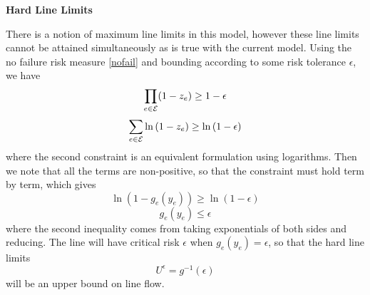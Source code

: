 \textbf{Hard Line Limits}

There is a notion of maximum line limits in this model, however these line limits cannot be attained simultaneously as is true with the current model.  Using the no failure risk measure \ref{nofail} and bounding according to some risk tolerance $\epsilon$, we have
\[ \prod_{e \in \mathcal{E}} (1-z_e) \geq 1 - \epsilon \]
\[ \sum_{e \in \mathcal{E}} \ln \left( 1-z_e \right) \geq \ln \left(1-\epsilon \right) \]
where the second constraint is an equivalent formulation using logarithms.
Then we note that all the terms are non-positive, so that the constraint must hold term by term, which gives
\[ \ln \left( 1 - g_e(y_e)  \right) \geq \ln \left( 1- \epsilon \right) \]
\begin{equation*}
g_e(y_e) \leq \epsilon
\end{equation*}
where the second inequality comes from taking exponentials of both sides and reducing. The line will have critical risk $\epsilon$ when $g_e(y_e) = \epsilon$, so that the hard line limits
\begin{equation} \label{hardline}
U^{\epsilon} = g^{-1}\left(\epsilon\right)
\end{equation}
will be an upper bound on line flow.
